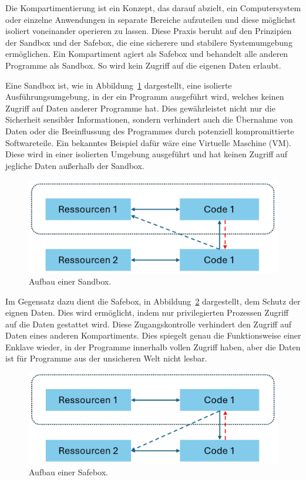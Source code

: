 Die Kompartimentierung ist ein Konzept, das darauf abzielt, ein Computersystem oder einzelne Anwendungen in separate Bereiche aufzuteilen und diese möglichst isoliert voneinander operieren zu lassen. Diese Praxis beruht auf den Prinzipien der Sandbox und der Safebox, die eine sicherere und stabilere Systemumgebung ermöglichen. Ein Kompartiment agiert als Safebox und behandelt alle anderen Programme als Sandbox. So wird kein Zugriff auf die eigenen Daten erlaubt.

Eine Sandbox ist, wie in Abbildung~\ref{fig:Sandbox} dargestellt, eine isolierte Ausführungsumgebung, in der ein Programm ausgeführt wird, welches keinen Zugriff auf Daten anderer Programme hat. 
Dies gewährleistet nicht nur die Sicherheit sensibler Informationen, sondern verhindert auch die Übernahme von Daten oder die Beeinflussung des Programmes durch potenziell kompromittierte Softwareteile. 
Ein bekanntes Beispiel dafür wäre eine Virtuelle Maschine (VM). Diese wird in einer isolierten Umgebung ausgeführt und hat keinen Zugriff auf jegliche Daten außerhalb der Sandbox.

\begin{figure}[h]
    \centering
    \includegraphics[width=0.8\linewidth]{Grafiken/Sandbox.png}
    \caption{Aufbau einer Sandbox.}
    \label{fig:Sandbox}
\end{figure}

Im Gegensatz dazu dient die Safebox, in Abbildung~\ref{fig:Safebox} dargestellt, dem Schutz der eignen Daten. Dies wird ermöglicht, indem nur privilegierten Prozessen Zugriff auf die Daten gestattet wird. Diese Zugangskontrolle verhindert den Zugriff auf Daten eines anderen Kompartiments. 
Dies spiegelt genau die Funktionsweise einer Enklave wieder, in der Programme innerhalb vollen Zugriff haben, aber die Daten ist für Programme aus der unsicheren Welt nicht lesbar.
\begin{figure}[h]
    \centering
    \includegraphics[width=0.8\linewidth]{Grafiken/Safebox.png}
    \caption{Aufbau einer Safebox.}
    \label{fig:Safebox}
\end{figure}

